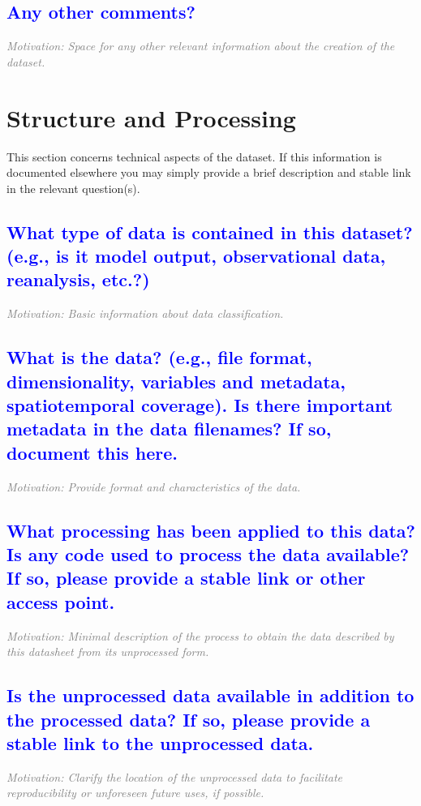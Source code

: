 \documentclass[letterpaper, 10 pt, transmag]{IEEEtran}
\begin{document}
\textcolor{blue}{\subsection{Any other comments?}}
\textcolor{gray}{\textit{Motivation: Space for any other relevant information about the creation of the dataset.}}  

\vspace{10mm}

\section{Structure and Processing}
This section concerns technical aspects of the dataset. If this information is documented elsewhere you may simply provide a brief description and stable link in the relevant question(s).

\textcolor{blue}{\subsection{What type of data is contained in this dataset? (e.g., is it model output, observational data, reanalysis, etc.?)}}
\textcolor{gray}{\textit{Motivation: Basic information about data classification.}}

\textcolor{blue}{\subsection{What is the data? (e.g., file format, dimensionality, variables and metadata, spatiotemporal coverage). Is there important metadata in the data filenames? If so, document this here.}}
\textcolor{gray}{\textit{Motivation: Provide format and characteristics of the data.}}

\textcolor{blue}{\subsection{What processing has been applied to this data? Is any code used to process the data available? If so, please provide a stable link or other access point.}}
\textcolor{gray}{\textit{Motivation: Minimal description of the process to obtain the data described by this datasheet from its unprocessed form.}}

\textcolor{blue}{\subsection{Is the unprocessed data available in addition to the processed data? If so, please provide a stable link to the unprocessed data.}}
\textcolor{gray}{\textit{Motivation: Clarify the location of the unprocessed data to facilitate reproducibility or unforeseen future uses, if possible.}}
\end{document}
